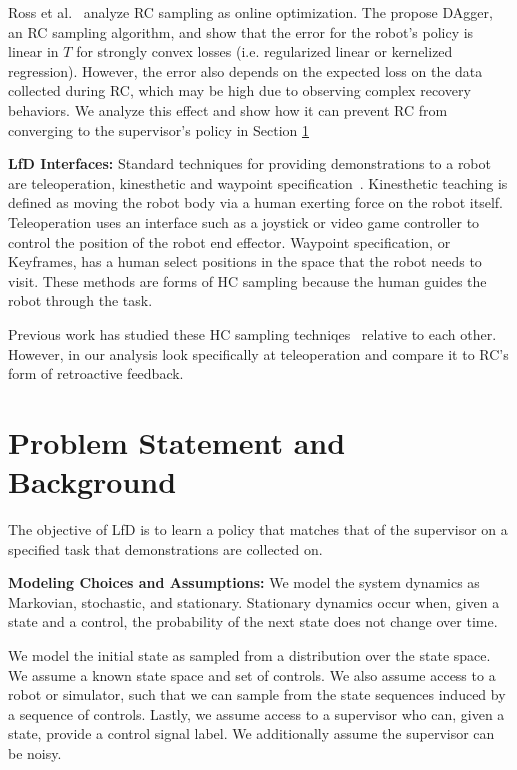 \documentclass[10pt, conference]{ieeeconf}      %
\begin{document}
Ross et al.~\cite{ross2010reduction} analyze RC sampling as online optimization. The propose DAgger, an RC sampling algorithm, and show that the error for the robot's policy is linear in $T$ for strongly convex losses (i.e.  regularized linear or kernelized regression). 
However, the error also depends on the expected loss on the data collected during RC, which may be high due to observing complex recovery behaviors. We analyze this effect and show how it can prevent RC from converging to the supervisor's policy in Section \ref{sec:PS}

\textbf{LfD Interfaces:}
Standard techniques for providing demonstrations to a robot are teleoperation, kinesthetic and waypoint specification~\cite{akgun2012keyframe,akgun2012novel,argall2009survey}. Kinesthetic teaching is defined as moving the robot body via a human exerting force on the robot itself. Teleoperation uses an interface such as a joystick or video game controller to control the position of the robot end effector. Waypoint specification, or Keyframes, has a human select positions in the space that the robot needs to visit. These methods are forms of HC sampling because the human guides the robot through the task. 

Previous work has studied these HC sampling techniqes~\cite{akgun2012keyframe,akgun2012novel} relative to each other. However, in our analysis look specifically at teleoperation and compare it to RC's form of retroactive feedback. 

\section{Problem Statement and Background}\label{sec:PS}
The objective of LfD is to learn a policy that matches that of the supervisor on a specified task that demonstrations are collected on.

\noindent\textbf{Modeling Choices and Assumptions:}  We model the system dynamics as Markovian, stochastic, and stationary. Stationary dynamics occur when, given a state and a control, the probability of the next state does not change over time. 

We model the initial state as sampled from a distribution over the state space.
We assume a known state space and set of controls. We also assume access to a robot or simulator, such that we  can sample from the state sequences induced by a sequence of controls.
Lastly, we assume access to a supervisor who can, given a state, provide a control signal label.
We additionally assume the supervisor can be noisy. 
\end{document}
